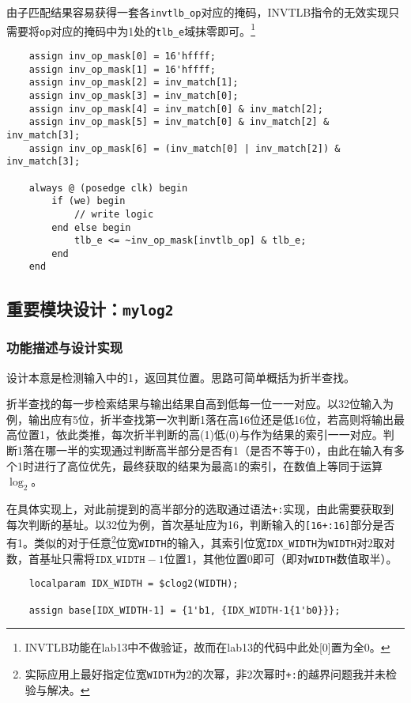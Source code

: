\documentclass[UTF-8,twoside,c5size]{ctexart}
\begin{document}
    由子匹配结果容易获得一套各\texttt{invtlb\_op}对应的掩码，INVTLB指令的无效实现只需要将\texttt{op}对应的掩码中为1处的\texttt{tlb\_e}域抹零即可。\footnote{INVTLB功能在lab13中不做验证，故而在lab13的代码中此处[0]置为全0。}
    
    \begin{verbatim}
    assign inv_op_mask[0] = 16'hffff;
    assign inv_op_mask[1] = 16'hffff;
    assign inv_op_mask[2] = inv_match[1];
    assign inv_op_mask[3] = inv_match[0];
    assign inv_op_mask[4] = inv_match[0] & inv_match[2];
    assign inv_op_mask[5] = inv_match[0] & inv_match[2] & inv_match[3];
    assign inv_op_mask[6] = (inv_match[0] | inv_match[2]) & inv_match[3];
    
    always @ (posedge clk) begin
        if (we) begin
            // write logic
        end else begin
            tlb_e <= ~inv_op_mask[invtlb_op] & tlb_e;
        end
    end
    \end{verbatim}
    
    \subsection{重要模块设计：\texttt{mylog2}}
    \subsubsection{功能描述与设计实现}
    
    设计本意是检测输入中的1，返回其位置。思路可简单概括为折半查找。
    
    折半查找的每一步检索结果与输出结果自高到低每一位一一对应。以32位输入为例，输出应有5位，折半查找第一次判断1落在高16位还是低16位，若高则将输出最高位置1，依此类推，每次折半判断的高(1)低(0)与作为结果的索引一一对应。判断1落在哪一半的实现通过判断高半部分是否有1（是否不等于0），由此在输入有多个1时进行了高位优先，最终获取的结果为最高1的索引，在数值上等同于运算$ \log_2 $。
    
    在具体实现上，对此前提到的高半部分的选取通过语法\texttt{+:}实现，由此需要获取到每次判断的基址。以32位为例，首次基址应为16，判断输入的\texttt{[16+:16]}部分是否有1。类似的对于任意\footnote{实际应用上最好指定位宽\texttt{WIDTH}为2的次幂，非2次幂时\texttt{+:}的越界问题我并未检验与解决。}位宽\texttt{WIDTH}的输入，其索引位宽\texttt{IDX\_WIDTH}为\texttt{WIDTH}对2取对数，首基址只需将$ \mathtt{IDX\_WIDTH}-1 $位置1，其他位置0即可（即对\texttt{WIDTH}数值取半）。
    
    \begin{verbatim}
    localparam IDX_WIDTH = $clog2(WIDTH);
    
    assign base[IDX_WIDTH-1] = {1'b1, {IDX_WIDTH-1{1'b0}}};
    \end{verbatim}
    
\end{document}
